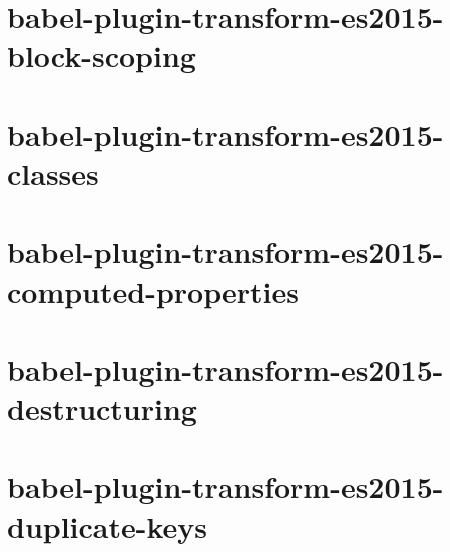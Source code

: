 \documentclass[twoside]{book}
\newcommand{\+}{\discretionary{\mbox{\scriptsize$\hookleftarrow$}}{}{}}
\begin{document}
\chapter{babel-\/plugin-\/transform-\/es2015-\/block-\/scoping}
\label{md__c_1_workspace_demo_src_main_script_node_modules_babel-plugin-transform-es2015-block-scoping__r_e_a_d_m_e}

\chapter{babel-\/plugin-\/transform-\/es2015-\/classes}
\label{md__c_1_workspace_demo_src_main_script_node_modules_babel-plugin-transform-es2015-classes__r_e_a_d_m_e}

\chapter{babel-\/plugin-\/transform-\/es2015-\/computed-\/properties}
\label{md__c_1_workspace_demo_src_main_script_node_modules_babel-plugin-transform-es2015-computed-properties__r_e_a_d_m_e}

\chapter{babel-\/plugin-\/transform-\/es2015-\/destructuring}
\label{md__c_1_workspace_demo_src_main_script_node_modules_babel-plugin-transform-es2015-destructuring__r_e_a_d_m_e}

\chapter{babel-\/plugin-\/transform-\/es2015-\/duplicate-\/keys}
\label{md__c_1_workspace_demo_src_main_script_node_modules_babel-plugin-transform-es2015-duplicate-keys__r_e_a_d_m_e}

\end{document}

